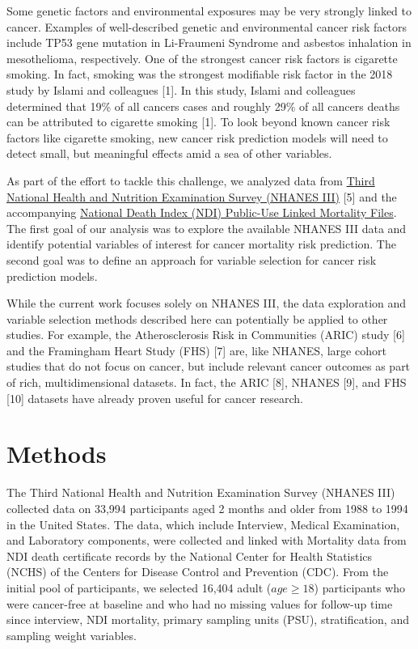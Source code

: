\documentclass[12pt,oneside]{reedthesis}
\theoremstyle{definition}
\theoremstyle{definition}
\theoremstyle{definition}
\theoremstyle{remark}
\begin{document}
Some genetic factors and environmental exposures may be very strongly
linked to cancer. Examples of well-described genetic and environmental
cancer risk factors include TP53 gene mutation in Li-Fraumeni Syndrome
and asbestos inhalation in mesothelioma, respectively. One of the
strongest cancer risk factors is cigarette smoking. In fact, smoking was
the strongest modifiable risk factor in the 2018 study by Islami and
colleagues {[}1{]}. In this study, Islami and colleagues determined that
19\% of all cancers cases and roughly 29\% of all cancers deaths can be
attributed to cigarette smoking {[}1{]}. To look beyond known cancer
risk factors like cigarette smoking, new cancer risk prediction models
will need to detect small, but meaningful effects amid a sea of other
variables.

As part of the effort to tackle this challenge, we analyzed data from
\href{https://wwwn.cdc.gov/nchs/nhanes/nhanes3/DataFiles.aspx}{Third
National Health and Nutrition Examination Survey (NHANES III)} {[}5{]}
and the accompanying
\href{https://www.cdc.gov/nchs/data-linkage/mortality-public.htm}{National
Death Index (NDI) Public-Use Linked Mortality Files}. The first goal of
our analysis was to explore the available NHANES III data and identify
potential variables of interest for cancer mortality risk prediction.
The second goal was to define an approach for variable selection for
cancer risk prediction models.

While the current work focuses solely on NHANES III, the data
exploration and variable selection methods described here can
potentially be applied to other studies. For example, the
Atherosclerosis Risk in Communities (ARIC) study {[}6{]} and the
Framingham Heart Study (FHS) {[}7{]} are, like NHANES, large cohort
studies that do not focus on cancer, but include relevant cancer
outcomes as part of rich, multidimensional datasets. In fact, the ARIC
{[}8{]}, NHANES {[}9{]}, and FHS {[}10{]} datasets have already proven
useful for cancer research.

\hypertarget{methods}{%
\section*{Methods}\label{methods}}

The Third National Health and Nutrition Examination Survey (NHANES III)
collected data on 33,994 participants aged 2 months and older from 1988
to 1994 in the United States. The data, which include Interview, Medical
Examination, and Laboratory components, were collected and linked with
Mortality data from NDI death certificate records by the National Center
for Health Statistics (NCHS) of the Centers for Disease Control and
Prevention (CDC). From the initial pool of participants, we selected
16,404 adult (\(age \geq 18\)) participants who were cancer-free at
baseline and who had no missing values for follow-up time since
interview, NDI mortality, primary sampling units (PSU), stratification,
and sampling weight variables.
\end{document}

